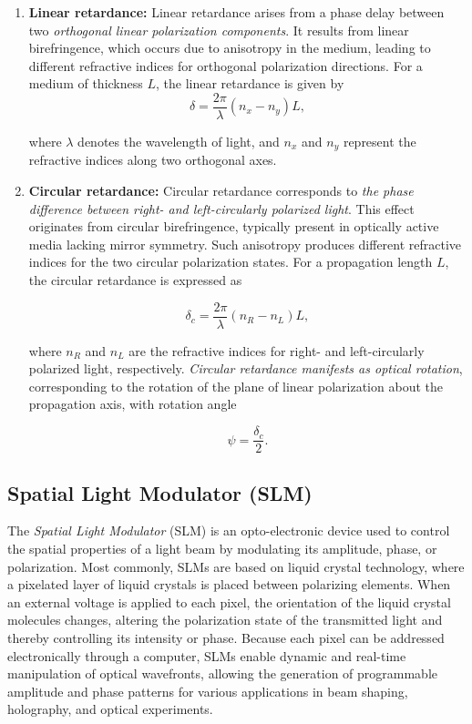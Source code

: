\begin{enumerate}
\item \textbf{Linear retardance:}
Linear retardance arises from a phase delay between two \textit{orthogonal linear polarization components}. It results from linear birefringence, which occurs due to anisotropy in the medium, leading to different refractive indices for orthogonal polarization directions. For a medium of thickness $L$, the linear retardance is given by
\begin{equation}
\delta = \frac{2\pi}{\lambda}(n_x - n_y)L,
\end{equation}

where $\lambda$ denotes the wavelength of light, and $n_x$ and $n_y$ represent the refractive indices along two orthogonal axes.

\item \textbf{Circular retardance:}
Circular retardance corresponds to \textit{the phase difference between right- and left-circularly polarized light}. This effect originates from circular birefringence, typically present in optically active media lacking mirror symmetry. Such anisotropy produces different refractive indices for the two circular polarization states. For a propagation length $L$, the circular retardance is expressed as

\begin{equation}
\delta_c = \frac{2\pi}{\lambda}(n_R - n_L)L,
\end{equation}

where $n_R$ and $n_L$ are the refractive indices for right- and
left-circularly polarized light, respectively. \textit{Circular retardance manifests as optical rotation}, corresponding to the rotation of the plane of linear polarization about the propagation axis, with rotation angle

\begin{equation}
\psi = \frac{\delta_c}{2}.
\end{equation}

\end{enumerate}

\subsection{Spatial Light Modulator (SLM)}
The \emph{Spatial Light Modulator} (SLM) is an opto-electronic device used to control the spatial properties of a light beam by modulating its amplitude, phase, or polarization. Most commonly, SLMs are based on liquid crystal technology, where a pixelated layer of liquid crystals is placed between polarizing elements. When an external voltage is applied to each pixel, the orientation of the liquid crystal molecules changes, altering the polarization state of the transmitted light and thereby controlling its intensity or phase. Because each pixel can be addressed electronically through a computer, SLMs enable dynamic and real-time manipulation of optical wavefronts, allowing the generation of programmable amplitude and phase patterns for various applications in beam shaping, holography, and optical experiments.


